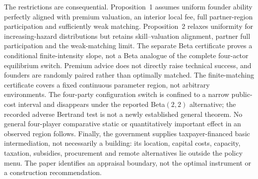 The restrictions are consequential. Proposition~1 assumes uniform founder ability perfectly aligned with premium valuation, an interior local fee, full partner-region participation and sufficiently weak matching. Proposition~2 relaxes uniformity for increasing-hazard distributions but retains skill--valuation alignment, partner full participation and the weak-matching limit. The separate Beta certificate proves a conditional finite-intensity slope, not a Beta analogue of the complete four-actor equilibrium switch. Premium advice does not directly raise technical success, and founders are randomly paired rather than optimally matched. The finite-matching certificate covers a fixed continuous parameter region, not arbitrary environments. The four-party configuration switch is confined to a narrow public-cost interval and disappears under the reported Beta$(2,2)$ alternative; the recorded adverse Bertrand test is not a newly established general theorem. No general four-player comparative static or quantitatively important effect in an observed region follows. Finally, the government supplies taxpayer-financed basic intermediation, not necessarily a building: its location, capital costs, capacity, taxation, subsidies, procurement and remote alternatives lie outside the policy menu. The paper identifies an appraisal boundary, not the optimal instrument or a construction recommendation.

